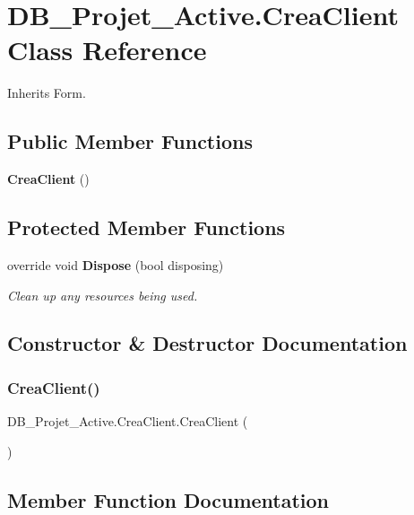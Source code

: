 \section{D\+B\+\_\+\+Projet\+\_\+\+Active.\+Crea\+Client Class Reference}
\label{class_d_b___projet___active_1_1_crea_client}


Inherits Form.

\subsection*{Public Member Functions}
\begin{DoxyCompactItemize}
\item 
\textbf{ Crea\+Client} ()
\end{DoxyCompactItemize}
\subsection*{Protected Member Functions}
\begin{DoxyCompactItemize}
\item 
override void \textbf{ Dispose} (bool disposing)
\begin{DoxyCompactList}\small\item\em Clean up any resources being used. \end{DoxyCompactList}\end{DoxyCompactItemize}


\subsection{Constructor \& Destructor Documentation}
\mbox{\label{class_d_b___projet___active_1_1_crea_client_a4ee5d0da88963756ca0d3e7c90e05735}} 
\subsubsection{CreaClient()}
{\footnotesize\ttfamily D\+B\+\_\+\+Projet\+\_\+\+Active.\+Crea\+Client.\+Crea\+Client (\begin{DoxyParamCaption}{ }\end{DoxyParamCaption})}



\subsection{Member Function Documentation}
\mbox{\label{class_d_b___projet___active_1_1_crea_client_a90a6217db2aa0fcb6f38649585ec9193}} 

